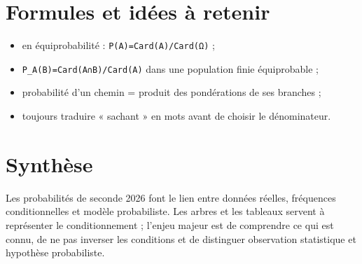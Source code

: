 \section{Formules et idées à retenir}

\begin{itemize}
\item en équiprobabilité : \texttt{P(A)=Card(A)/Card(Ω)} ;
\item \texttt{P_A(B)=Card(A∩B)/Card(A)} dans une population finie équiprobable ;
\item probabilité d'un chemin = produit des pondérations de ses branches ;
\item toujours traduire « sachant » en mots avant de choisir le dénominateur.
\end{itemize}

\section{Synthèse}

Les probabilités de seconde 2026 font le lien entre données réelles, fréquences conditionnelles et modèle probabiliste. Les arbres et les tableaux servent à représenter le conditionnement ; l'enjeu majeur est de comprendre ce qui est connu, de ne pas inverser les conditions et de distinguer observation statistique et hypothèse probabiliste.
